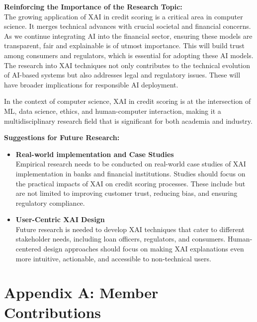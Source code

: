 \documentclass[12pt,a4paper]{article}
\begin{document}
\textbf{Reinforcing the Importance of the Research Topic:}\\
The growing application of XAI in credit scoring is a critical area in computer science. It merges technical advances with crucial societal and financial concerns. As we continue integrating AI into the financial sector, ensuring these models are transparent, fair and explainable is of utmost importance. This will build trust among consumers and regulators, which is essential for adopting these AI models.  The research into XAI techniques not only contributes to the technical evolution of AI-based systems but also addresses legal and regulatory issues. These will have broader implications for responsible AI deployment.

In the context of computer science, XAI in credit scoring is at the intersection of ML, data science, ethics, and human-computer interaction, making it a multidisciplinary research field that is significant for both academia and industry.

\textbf{Suggestions for Future Research:}\\
\begin{itemize}
    \vspace{-3em}
    \item \textbf{Real-world implementation and Case Studies}\\
    Empirical research needs to be conducted on real-world case studies of XAI implementation in banks and financial institutions. Studies should focus on the practical impacts of XAI on credit scoring processes. These include but are not limited to improving customer trust, reducing bias, and ensuring regulatory compliance.
    \item \textbf{User-Centric XAI Design}\\
    Future research is needed to develop XAI techniques that cater to different stakeholder needs, including loan officers, regulators, and consumers. Human-centered design approaches should focus on making XAI explanations even more intuitive, actionable, and accessible to non-technical users.
\end{itemize}

\newpage
 
 


\appendix
\section{Appendix A: Member Contributions}
\end{document}
